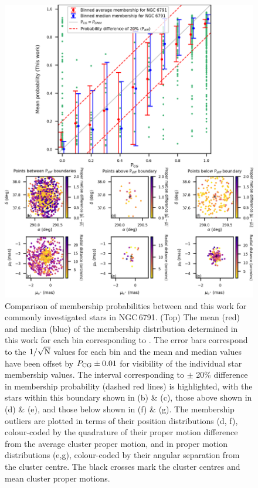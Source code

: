 \begin{figure}[hbtp]
    \centering
    \includegraphics[width=0.95\linewidth]{Chapter4/NGC6791_CG_comparison_mod.png}
    \caption[Comparison of membership probabilities for NGC\,6791]{Comparison of membership probabilities between \cite{cantat-gaudin_gaia_2018} and this work for commonly investigated stars in NGC\,6791. (Top) The mean (red) and median (blue) of the membership distribution determined in this work for each bin corresponding to \cite{cantat-gaudin_gaia_2018}. The error bars correspond to the $1/\sqrt{\rm N}$ values for each bin and the mean and median values have been offset by $P_{\rm CG} \pm 0.01$ for visibility of the individual star membership values. The interval corresponding to $\pm$ 20\% difference in membership probability (dashed red lines) is highlighted, with the stars within this boundary shown in (b) \& (c), those above shown in (d) \& (e), and those below shown in (f) \& (g). The membership outliers are plotted in terms of their position distributions (d, f), colour-coded by the quadrature of their proper motion difference from the average cluster proper motion, and in proper motion distributions (e,g), colour-coded by their angular separation from the cluster centre. The black crosses mark the cluster centres and mean cluster proper motions.}
    \label{fig:CG_6791_comparison}
\end{figure}

